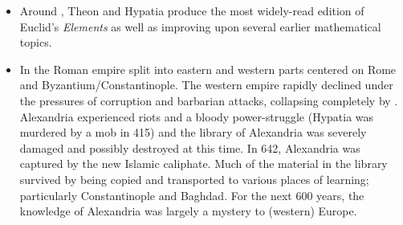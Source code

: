 \begin{itemize}
  \item Around , Theon and Hypatia produce the most widely-read edition of Euclid's \emph{Elements} as well as improving upon several earlier mathematical topics.
  
  \item In  the Roman empire split into eastern and western parts centered on Rome and Byzantium/Constantinople. The western empire rapidly declined under the pressures of corruption and barbarian attacks, collapsing completely by . Alexandria experienced riots and a bloody power-struggle (Hypatia was murdered by a mob in 415) and the library of Alexandria was severely damaged and possibly destroyed at this time. In 642, Alexandria was captured by the new Islamic caliphate. Much of the material in the library survived by being copied and transported to various places of learning; particularly Constantinople and Baghdad. For the next 600 years, the knowledge of Alexandria was largely a mystery to (western) Europe.
\end{itemize}


\goodbreak


